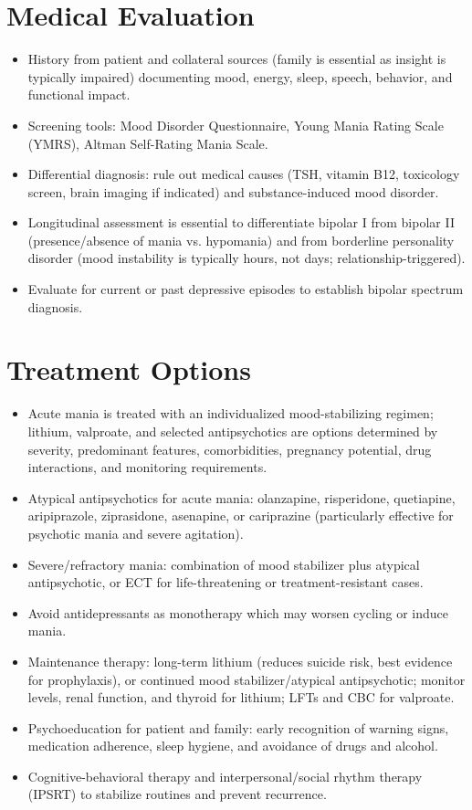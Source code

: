 \section*{Medical Evaluation}
\begin{itemize}
  \item History from patient and collateral sources (family is essential as insight is typically impaired) documenting mood, energy, sleep, speech, behavior, and functional impact.
  \item Screening tools: Mood Disorder Questionnaire, Young Mania Rating Scale (YMRS), Altman Self-Rating Mania Scale.
  \item Differential diagnosis: rule out medical causes (TSH, vitamin B12, toxicology screen, brain imaging if indicated) and substance-induced mood disorder.
  \item Longitudinal assessment is essential to differentiate bipolar I from bipolar II (presence/absence of mania vs. hypomania) and from borderline personality disorder (mood instability is typically hours, not days; relationship-triggered).
  \item Evaluate for current or past depressive episodes to establish bipolar spectrum diagnosis.
\end{itemize}

\section*{Treatment Options}
\begin{itemize}
  \item Acute mania is treated with an individualized mood-stabilizing regimen; lithium, valproate, and selected antipsychotics are options determined by severity, predominant features, comorbidities, pregnancy potential, drug interactions, and monitoring requirements.
  \item Atypical antipsychotics for acute mania: olanzapine, risperidone, quetiapine, aripiprazole, ziprasidone, asenapine, or cariprazine (particularly effective for psychotic mania and severe agitation).
  \item Severe/refractory mania: combination of mood stabilizer plus atypical antipsychotic, or ECT for life-threatening or treatment-resistant cases.
  \item Avoid antidepressants as monotherapy which may worsen cycling or induce mania.
  \item Maintenance therapy: long-term lithium (reduces suicide risk, best evidence for prophylaxis), or continued mood stabilizer/atypical antipsychotic; monitor levels, renal function, and thyroid for lithium; LFTs and CBC for valproate.
  \item Psychoeducation for patient and family: early recognition of warning signs, medication adherence, sleep hygiene, and avoidance of drugs and alcohol.
  \item Cognitive-behavioral therapy and interpersonal/social rhythm therapy (IPSRT) to stabilize routines and prevent recurrence.
\end{itemize}


